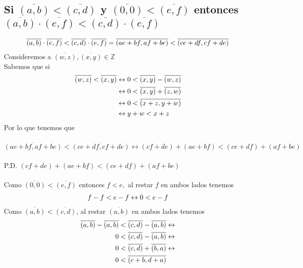 \documentclass[12pt]{article}
\begin{document}
	    \subsection{Si $\overline{(a,b)} < \overline{(c,d)}$ y $\overline{(0,0)} < \overline{(e,f)}$ entonces $\overline{(a,b)}\cdot\overline{(e, f)} < \overline{(c,d)}\cdot\overline{(e,f)}$}
	         \begin{align}
	            \notag \overline{(a,b)}\cdot\overline{(e, f)} < \overline{(c,d)} \cdot \overline{(e,f)} = \overline{(ae + bf, af + be)} < \overline{(ce + df, cf + de)}
	        \end{align}
	        Consideremos a $\overline{(w,z)},\overline{(x,y)} \in \mathbb{Z}$ \\
	        Sabemos que si \\
	        \begin{equation}
	        \begin{split} \notag
	            \overline{(w,z)} < \overline{(x,y)} &\leftrightarrow 0 < \overline{(x,y)} - \overline{(w,z)} \\
	            &\leftrightarrow 0 < \overline{(x,y)} + \overline{(z,w)} \\
	            &\leftrightarrow 0 < \overline{(x+z,y+w)} \\
	            &\leftrightarrow y + w < x+z \\
	        \end{split}
	        \end{equation}
	        Por lo que tenemos que \\ \\
	        \( \overline{(ae+bf,af+be)} < \overline{(ce+df,cf+de)} \leftrightarrow (cf+de) + (ae+bf) < (ce+df) + (af+be)\) \\ \\
	        P.D. $(cf+de) + (ae+bf) < (ce+df) + (af+be)$ \\ \\
	        Como $\overline{(0,0)} < \overline{(e,f)}$ entonces $f < e, $ al restar $f$ en ambos lados tenemos
	        \begin{align}
	            \notag f-f < e -f \leftrightarrow 0 < e-f
	        \end{align}
	        Como $\overline{(a,b)} < \overline{(c,d)}$, al restar $ \overline{(a,b)}$ en ambos lados tenemos \\
	        \begin{equation}
	        \begin{split} \notag
	            \overline{(a,b)}-\overline{(a,b)} &< \overline{(c,d)} - \overline{(a,b)} \leftrightarrow \\
	            0 &< \overline{(c,d)} - \overline{(a,b)} \leftrightarrow \\
	            0 &< \overline{(c,d)} + \overline{(b,a)} \leftrightarrow \\
	            0 &< \overline{(c+b,d+a)} \\
	        \end{split}
	        \end{equation}
\end{document}
